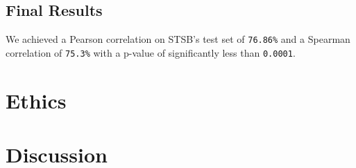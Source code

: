 \documentclass[14pt]{article}
\begin{document}
\subsection{Final Results}
We achieved a Pearson correlation on STSB's test set of \verb|76.86%| and a Spearman correlation of \verb|75.3%| with a p-value of significantly less than \verb|0.0001|.

\section{Ethics}

\section{Discussion}
\end{document}
